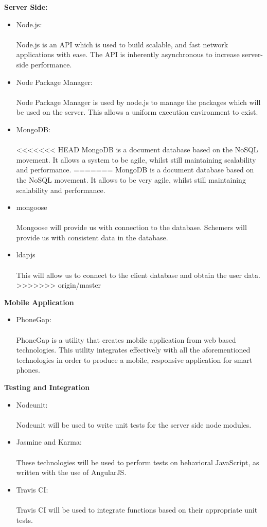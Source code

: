 {\bfseries Server Side:}
\begin{itemize}
	\item Node.js:\\ \\ 
	Node.js is an API which is used to build scalable, and fast network applications with ease. The API is inherently asynchronous to increase server-side performance.
	\item Node Package Manager:\\ \\
	Node Package Manager is used by node.js to manage the packages which will be used on the server. This allows a uniform execution environment to exist.
	\item MongoDB: \\ \\
<<<<<<< HEAD
	MongoDB is a document database based on the NoSQL movement. It allows a system to be agile, whilst still maintaining scalability and performance.
=======
	MongoDB is a document database based on the NoSQL movement. It allows to be very agile, whilst still maintaining scalability and performance.
	\item mongoose \\ \\
	Mongoose will provide us with connection to the database. Schemers will provide us with consistent data in the database.
	\item ldapjs \\ \\
	This will allow us to connect to the client database and obtain the user data.
>>>>>>> origin/master
\end{itemize}
{\bfseries Mobile Application}
\begin{itemize}
	\item PhoneGap:\\ \\
	PhoneGap is a utility that creates mobile application from web based technologies. This utility integrates effectively with all the aforementioned technologies in order to produce a mobile, responsive application for smart phones.
\end{itemize}
{\bfseries Testing and Integration}
\begin{itemize}
	\item Nodeunit:\\ \\
	Nodeunit will be used to write unit tests for the server side node modules.
	\item Jasmine and Karma:\\ \\
	These technologies will be used to perform tests on behavioral JavaScript, as written with the use of AngularJS.
	\item Travis CI:\\ \\
	Travis CI will be used to integrate functions based on their appropriate unit tests.
\end{itemize}